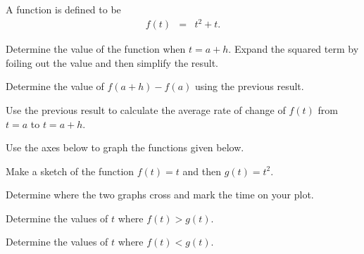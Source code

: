 \begin{problem}
\item A function is defined to be
  \begin{eqnarray*}
    f(t) & = & t^2 + t.
  \end{eqnarray*}
  \begin{subproblem}
  \item Determine the value of the function when $t=a+h$. Expand the
    squared term by foiling out the value and then simplify the
    result.
    \vfill
  \item Determine the value of $f(a+h)-f(a)$ using the previous
    result.
    \vfill
  \item Use the previous result to calculate the average rate of
    change of $f(t)$ from $t=a$ to $t=a+h$.
    \vfill
  \end{subproblem}

  \clearpage

\item Use the axes below to graph the functions given below.

  \scalebox{0.7}{}

  \begin{subproblem}
  \item Make a sketch of the function $f(t)=t$ and then $g(t)=t^2$.
  \item Determine where the two graphs cross and mark the time on your
    plot.
    \clearpage
  \item Determine the values of $t$ where $f(t)>g(t)$.
    \vfill
  \item Determine the values of $t$ where $f(t)<g(t)$.
    \vfill
  \end{subproblem}


\end{problem}



